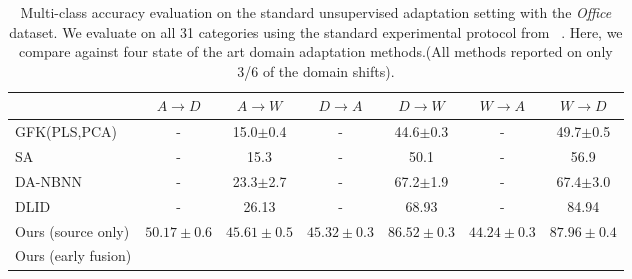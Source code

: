 \begin{table*}
  \setlength{\tabcolsep}{4pt}
  \small
\centering
\begin{tabular}{lcccccc}
\toprule
                     & $A \rightarrow D$   & $A \rightarrow W$   & $D \rightarrow A$   & $D \rightarrow W$   & $W \rightarrow A$   & $W \rightarrow D$   \\
\midrule
GFK(PLS,PCA)~\cite{gong-cvpr12} & - & 15.0$\pm$0.4 & - & 44.6$\pm$0.3 & - & 49.7$\pm$0.5\\
SA~\cite{fernando-iccv13} & - & 15.3 & - & 50.1& - & 56.9\\
DA-NBNN~\cite{da-nbnn} & - & 23.3$\pm$2.7 & - & 67.2$\pm$1.9 & - & 67.4$\pm$3.0\\
DLID~\cite{ref:dlid} & - & 26.13 & - & 68.93 & - & 84.94\\                     
\midrule
 Ours (source only)   & $50.17 \pm 0.6$     & $45.61 \pm 0.5$     & $45.32 \pm 0.3$     & $\bm{86.52 \pm 0.3}$     & $44.24 \pm 0.3$     & $87.96 \pm 0.4$     \\
Ours (early fusion)&      \\
\bottomrule
\end{tabular}

\caption{Multi-class accuracy evaluation on the standard unsupervised adaptation setting with the \emph{Office} dataset. We evaluate on all 31 categories using the standard experimental protocol from ~\cite{gong-cvpr12}. Here, we compare against four state of the art domain adaptation methods.(All methods reported on only 3/6 of the domain shifts).}
\label{table:full-unsuper}
\end{table*}

